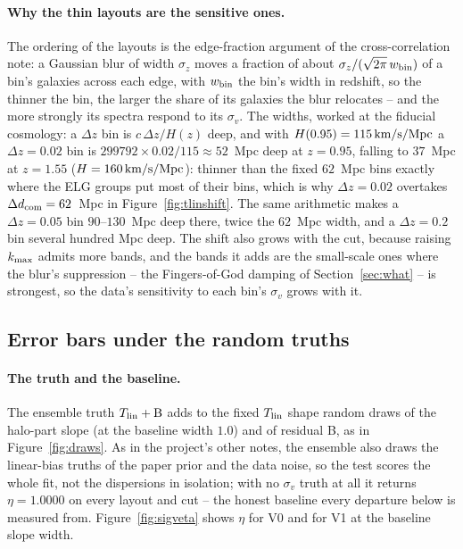 \documentclass[11pt]{article}
\newcommand{\sv}{\sigma_v}
\newcommand{\kms}{\,{\rm km/s}}
\newcommand{\kmax}{k_{\rm max}}
\newcommand{\dcom}{$\Delta d_{\rm com} = 62$~Mpc}
\begin{document}
\paragraph{Why the thin layouts are the sensitive ones.}
The ordering of the layouts is the edge-fraction argument of the
cross-correlation note: a Gaussian blur of width $\sigma_z$ moves a
fraction of about $\sigma_z/(\sqrt{2\pi}\,w_{\rm bin})$ of a bin's
galaxies across each edge, with $w_{\rm bin}$ the bin's width in
redshift, so the thinner the bin, the larger the share of its
galaxies the blur relocates -- and the more strongly its spectra
respond to its $\sv$.  The widths, worked at the fiducial cosmology:
a $\Delta z$ bin is $c\,\Delta z/H(z)$ deep, and with
$H(0.95) = 115\kms/{\rm Mpc}$ a $\Delta z = 0.02$ bin is
$299792 \times 0.02/115 \approx 52$~Mpc deep at $z = 0.95$, falling
to $37$~Mpc at $z = 1.55$ ($H = 160\kms/{\rm Mpc}$): thinner than the
fixed $62$~Mpc bins exactly where the ELG groups put most of their
bins, which is why $\Delta z = 0.02$ overtakes \dcom{} in
Figure~\ref{fig:tlinshift}.  The same arithmetic makes a
$\Delta z = 0.05$ bin $90$--$130$~Mpc deep there, twice the $62$~Mpc
width, and a $\Delta z = 0.2$ bin several hundred Mpc deep.  The
shift also grows with the cut, because raising $\kmax$ admits more
bands, and the bands it adds are the small-scale ones where the
blur's suppression -- the Fingers-of-God damping of
Section~\ref{sec:what} -- is strongest, so the data's sensitivity to
each bin's $\sv$ grows with it.

\subsection{Error bars under the random truths}
\label{sec:res-eta}

\paragraph{The truth and the baseline.}
The ensemble truth $T_{\rm lin} + {\rm B}$ adds to the fixed
$T_{\rm lin}$ shape random draws of the halo-part slope (at the
baseline width $1.0$) and of residual B, as in
Figure~\ref{fig:draws}.  As in the project's other notes, the
ensemble also draws the linear-bias truths of the paper prior and the
data noise, so the test scores the whole fit, not the dispersions in
isolation; with no $\sv$ truth at all it returns
$\eta = 1.0000$ on every layout and cut -- the honest baseline every
departure below is measured from.  Figure~\ref{fig:sigveta} shows
$\eta$ for V0 and for V1 at the baseline slope width.
\end{document}
